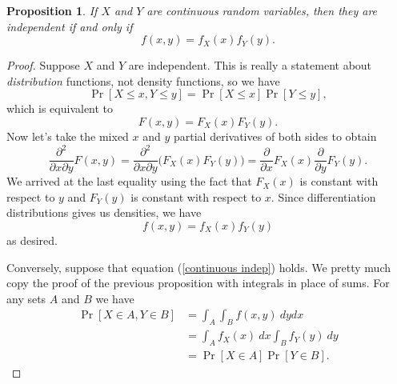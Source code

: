 \documentclass[12pt]{article}
\theoremstyle{plain}
\newtheorem{proposition}[theorem]{Proposition}
\theoremstyle{definition}
\theoremstyle{remark}
\begin{document}
\begin{proposition}
    If $X$ and $Y$ are continuous random variables, then they are independent if and only if
    \[
        f(x,y) = f_X(x)f_Y(y).
    \]
\end{proposition}
\begin{proof}
    Suppose $X$ and $Y$ are independent.
    This is really a statement about \emph{distribution} functions, not density functions, so we have
    \begin{equation}\label{continuous indep}
        \Pr[X\leq x, Y\leq y] = \Pr[X\leq x]\Pr[Y\leq y],
    \end{equation}
    which is equivalent to
    \[
        F(x,y) = F_X(x)F_Y(y).
    \]
    Now let's take the mixed $x$ and $y$ partial derivatives of both sides to obtain
    \[
        \frac{\partial^2}{\partial x\partial y}F(x,y) = \frac{\partial^2}{\partial x\partial y}\big(F_X(x)F_Y(y)\big) = \frac{\partial}{\partial x}F_X(x)\frac{\partial}{\partial y}F_Y(y).
    \]
    We arrived at the last equality using the fact that $F_X(x)$ is constant with respect to $y$ and $F_Y(y)$ is constant with respect to $x$.
    Since differentiation distributions gives us densities, we have
    \[
        f(x,y) = f_X(x)f_Y(y)
    \]
    as desired.

    Conversely, suppose that equation (\ref{continuous indep}) holds.
    We pretty much copy the proof of the previous proposition with integrals in place of sums.
    For any sets $A$ and $B$ we have
    \begin{align*}
        \Pr[X\in A, Y\in B] &= \int_A\int_Bf(x,y)\ dydx\\
        &= \int_Af_X(x)\ dx\int_Bf_Y(y)\ dy\\
        &= \Pr[X\in A]\Pr[Y\in B].
    \end{align*}
\end{proof}
\end{document}
